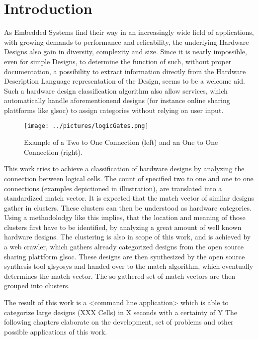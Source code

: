 
\section{Introduction}
As Embedded Systems find their way in an increasingly wide field of applications,
with growing demands to performance and relieability, the underlying Hardware 
Designs also gain in diversity, complexity and size. Since it is nearly impossible,
even for simple Designs, to determine the function of such, without proper
documentation, a possibility to extract information directly from the Hardware 
Description Language representation of the Design, seems to be a welcome aid.
Such a hardware design classification algorithm also allow services, which 
automatically handle aforementionend designs (for instance online sharing 
plattforms like gls{oc}) to assign categories without relying on user input.

\begin{figure}[h]
 \centering
 \texttt{[image: ../pictures/logicGates.png]}
 \caption{Example of a Two to One Connection (left) and an One to One Connection (right).}
 \label{fig:logicGates}
\end{figure}

This work tries to achieve a classification of hardware designs by analyzing the 
connection between logical cells. The count of specified two to one and one to 
one connections (examples depictioned in illustration), are translated into a
standardized match vector. It is expected that the match vector of similar designs
gather in clusters. These clusters can then be understood as hardware categories. 
Using a methodolodgy like this implies, that the location and meaning of those clusters first 
have to be identified, by analyzing a great amount of well known hardware designs.
The clustering is also in scope of this work, and is achieved by a web crawler,
which gathers already categorized designs from the open source sharing plattform 
gls{oc}. These designs are then synthesized by the open source synthesis tool 
gls{yosys} and handed over to the match algorithm, which eventually determines 
the match vector. The so gathered set of match vectors are then grouped into clusters.

The result of this work is a <command line application> which is able to 
categorize large designs (XXX Cells) in X seconds with a certainty of Y%
The following chapters elaborate on the development, set of problems and 
other possible applications of this work. 
  
